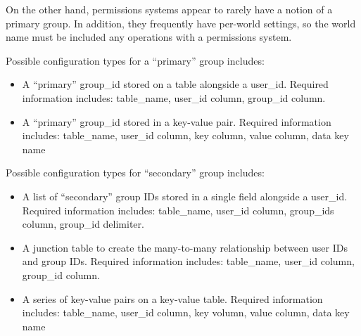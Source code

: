 \documentclass[letterpaper,12pt]{article}
\begin{document}
  On the other hand, permissions systems appear to rarely have a notion of a
  primary group. In addition, they frequently have per-world settings, so the
  world name must be included any operations with a permissions system.

  Possible configuration types for a ``primary'' group includes:
  \begin{itemize}
   \item A ``primary'' group\_id stored on a table alongside a user\_id. 
Required
    information includes: table\_name, user\_id column, group\_id column.
   \item A ``primary'' group\_id stored in a key-value pair. Required 
information
    includes: table\_name, user\_id column, key column, value column, data key 
name
  \end{itemize}

  Possible configuration types for ``secondary'' group includes:
  \begin{itemize}
   \item A list of ``secondary'' group IDs stored in a single field alongside a
    user\_id. Required information includes: table\_name, user\_id column,
    group\_ids column, group\_id delimiter.
   \item A junction table to create the many-to-many relationship between
    user IDs and group IDs. Required information includes: table\_name, user\_id
    column, group\_id column.
   \item A series of key-value pairs on a key-value table. Required information
    includes: table\_name, user\_id column, key volumn, value column, data key 
name
  \end{itemize}
\end{document}

